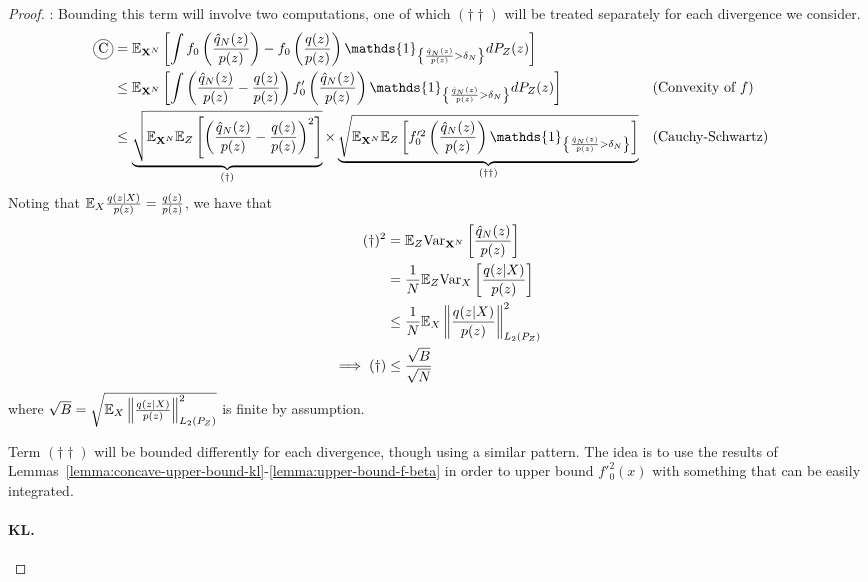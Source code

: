 \begin{proof}
:
Bounding this term will involve two computations, one of which $(\dagger\dagger)$ will be treated separately for each divergence we consider.
%
\begin{align*}
    \encircle{C} &= \E_{\XN}\left[\int f_0\left( \frac{\hat{q}_N(z)}{p(z)}\right) - f_0\left( \frac{q(z)}{p(z)} \right) \mathds{1}_{\left\lbrace \frac{\hat{q}_N(z)}{p(z)} > \delta_N \right\rbrace} dP_Z(z)\right] \\
    &\leq \E_{\XN} \left[ \int \left(\frac{\hat{q}_N(z)}{p(z)} - \frac{q(z)}{p(z)}\right) f'_0\left(\frac{\hat{q}_N(z)}{p(z)} \right) \mathds{1}_{\left\lbrace \frac{\hat{q}_N(z)}{p(z)} > \delta_N \right\rbrace} dP_Z(z) \right]
    && \text{(Convexity of $f$)}
    \\
    &\leq \underbrace{\sqrt{\E_{\XN} \E_{Z}\left[ \left(\frac{\hat{q}_N(z)}{p(z)} - \frac{q(z)}{p(z)}\right)^2 \right]}}_{(\dagger)} \times 
    \underbrace{\sqrt{\E_{\XN} \E_{Z} \left[ f'^2_0\left(\frac{\hat{q}_N(z)}{p(z)} \right) \mathds{1}_{\left\lbrace \frac{\hat{q}_N(z)}{p(z)} > \delta_N \right\rbrace} \right]}}_{(\dagger\dagger)}
    && \text{(Cauchy-Schwartz)}
\end{align*}
Noting that $\mathbb{E}_{X} \frac{q(z|X)}{p(z)} = \frac{q(z)}{p(z)}$, we have that
\begin{align*}
    (\dagger)^2
    &= \mathbb{E}_Z \text{Var}_{\mathbf{X}^N} \left[ \frac{\hat{q}_N(z)}{p(z)}\right] \\
    &=  \frac{1}{N} \mathbb{E}_Z \text{Var}_{X} \left[ \frac{q(z|X)}{p(z)}\right] \\
    &\leq \frac{1}{N} \mathbb{E}_X \left\|\frac{q(z|X)}{p(z)} \right\|^2_{L_2(P_Z)}\\
    \implies (\dagger) &\leq \frac{\sqrt{B}}{\sqrt{N}}
\end{align*}
where $\sqrt{B} = \sqrt{\mathbb{E}_X \left\|\frac{q(z|X)}{p(z)} \right\|^2_{L_2(P_Z)}}$ is finite by assumption.

Term $(\dagger\dagger)$ will be bounded differently for each divergence, though using a similar pattern. 
The idea is to use the results of Lemmas~\ref{lemma:concave-upper-bound-kl}-\ref{lemma:upper-bound-f-beta} in order to upper bound $f'^2_0(x)$ with something that can be easily integrated.

\paragraph{KL.}


\end{proof}
